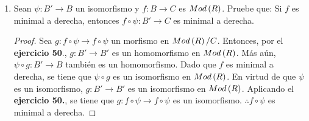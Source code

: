 \documentclass{article}
\begin{document}
\begin{enumerate}[label=\textbf{Ej \arabic*.}]
\begin{proof}
		$\boxed{\Leftarrow )}$ Sean $x_{1},...,x_{n} \in X$ y $r_{x_{1}},...r_{x_{n}} \in R$ tales que $\displaystyle\Sigma_{k=1}^{n}r_{x_{k}}x_{k}=0$. Completamos a un elemento de $F(X)$ como $r_{x}=0$, con $x\not\in\lrbrack{x_{1},...,x_{n}}$. Con lo cual tenemos que:
		\begin{align*}
			\overline{\varepsilon}_{X,M}\lrprth{\arbtfam{r}{x}{X}} &= \displaystyle\Sigma_{x \in X}r_{x}x\\
			&=\displaystyle\Sigma_{k=1}^{n}r_{x_{k}}x_{k}\\
			&=0
		\end{align*}
		Entonces $\lrbrack{r}{x}{X} \in Ker\lrprth{\overline{\varepsilon}_{X,M}} = 0$. Por tanto, $r_{x_{1}}=...=r_{x_{n}}=0$.\\
		$\therefore X$ es $R$-linealmente independiente.\\
		
		$\boxed{\text{(d)}}$ Este resultado se concluye de los anteriores. En efecto,
		\begin{align*}
			\overline{\varepsilon}_{X,M}\ es\ un\ isomorfismo & \Leftrightarrow\overline{\varepsilon}_{X,M}\ es\ un\ epimorfismo\ y\ monomorfismo\\
			& \Leftrightarrow M=im\lrprth{\overline{\varepsilon}_{X,M}}\ y\ X\ es\ R-l.i.\\
			& \Leftrightarrow X\ es\ una\ R-base.
		\end{align*}
	\end{proof}
	
	\item Sean $\psi : B' \longrightarrow B$ un isomorfismo y $f:B \longrightarrow C$ es $Mod\left(R\right)$. Pruebe que: Si $f$ es minimal a derecha, entonces $f\circ\psi :B' \longrightarrow C$ es minimal a derecha.
	\begin{proof}
		Sea $g:f\circ\psi \longrightarrow f\circ\psi$ un morfismo en $Mod\left(R\right)/C$. Entonces, por el \textbf{ejercicio 50}., $g:B' \longrightarrow B'$ es un homomorfismo en $Mod\left(R\right)$. Más aún, $\psi \circ g:B' \longrightarrow B$ también es un homomorfismo. Dado que $f$ es minimal a derecha, se tiene que $\psi \circ g$ es un isomorfismo en $Mod\left(R\right)$. En virtud de que $\psi$ es un isomorfismo, $g:B' \longrightarrow B'$ es un isomorfismo en $Mod\left(R\right)$. Aplicando el \textbf{ejercicio 50.}, se tiene que $g:f\circ\psi \longrightarrow f\circ\psi$ es un isomorfismo. $\therefore f\circ\psi$ es minimal a derecha.
	\end{proof}
	

\end{enumerate}
\end{document}
